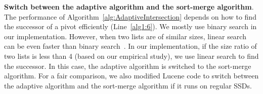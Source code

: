 \textbf{Switch between the adaptive algorithm and the sort-merge algorithm}. The performance of Algorithm~\ref{alg:AdaptiveIntersection} depends on how to find the successor of a pivot efficiently (Line~\ref{alg1:6}). We mostly use binary search in our implementation. However, when two lists are of similar sizes, linear search can be even faster than binary search~\cite{Ding2011}. In our implementation, if the size ratio of two lists is less than 4 (based on our empirical study), we use linear search to find the successor. In this case, the adaptive algorithm is switched to the sort-merge algorithm. For a fair comparison, we also modified Lucene code to switch between the adaptive algorithm and the sort-merge algorithm if it runs on regular SSDs.



